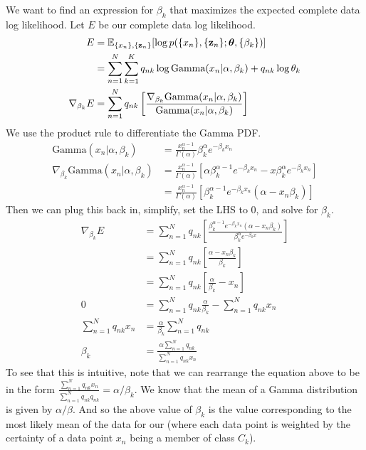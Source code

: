 \documentclass[submit]{harvardml}
\newcommand{\E}{\mathbb{E}}
\begin{document}
We want to find an expression for $\beta_k$ that maximizes the expected complete data log likelihood. Let $E$ be our complete data log likelihood.
\begin{align*}
    E &= \E_{\{x_n\}, \{\vb{z}_n\}}[\log p(\{x_n\}, \{ \vb{z}_n \} ; \btheta, \{ \beta_k \})]\\
    &= \sum_{n=1}^N \sum_{k=1}^K q_{n k} \log \text{Gamma}(x_n | \alpha, \beta_k) + q_{n k} \log \theta_k \\
    \nabla_{\beta_k}E &= \sum_{n=1}^N q_{n k} \left[\frac{\nabla_{\beta_k} \text{Gamma}(x_n | \alpha, \beta_k)}{\text{Gamma}(x_n | \alpha, \beta_k)}  \right]
\end{align*}
We use the product rule to differentiate the Gamma PDF.
\begin{align*}
    \text{Gamma}(x_n | \alpha, \beta_k) &= \frac{x_n^{\alpha - 1}}{\Gamma(\alpha)}\beta_k^{\alpha}e^{-\beta_k x_n}\\
    \nabla_{\beta_k}\text{Gamma}(x_n | \alpha, \beta_k) &= \frac{x_n^{\alpha - 1}}{\Gamma(\alpha)} \left[ \alpha \beta_k^{\alpha - 1} e^{-\beta_k x_n} - x \beta_k^{\alpha} e^{- \beta_k x_n} \right]\\
    &= \frac{x_n^{\alpha - 1}}{\Gamma(\alpha)} \left[ \beta_k^{\alpha - 1}e^{-\beta_k x_n}(\alpha - x_n \beta_k) \right]
\end{align*}
Then we can plug this back in, simplify, set the LHS to 0, and solve for $\beta_k$.
\begin{align*}
    \nabla_{\beta_k}E &= \sum_{n=1}^N q_{n k} \left[\frac{\beta_k^{\alpha - 1}e^{-\beta_k x_n}(\alpha - x_n \beta_k)}{\beta_k^{\alpha} e^{-\beta_k x}}\right]\\
    &= \sum_{n=1}^N q_{n k} \left[ \frac{\alpha - x_n \beta_k}{\beta_k}\right]\\
    &= \sum_{n=1}^N q_{n k} \left[ \frac{\alpha}{\beta_k} - x_n\right]\\
    0 &= \sum_{n=1}^N q_{n k} \frac{\alpha}{\beta_k} - \sum_{n=1}^N q_{n k} x_n \\
    \sum_{n=1}^N q_{n k} x_n &= \frac{\alpha}{\beta_k} \sum_{n=1}^N q_{n k} \\
    \beta_k &= \frac{\alpha \sum_{n=1}^N q_{n k}}{\sum_{n=1}^N q_{n k} x_n}
\end{align*}
To see that this is intuitive, note that we can rearrange the equation above to be in the form $\frac{\sum_{n=1}^N q_{n k} x_n}{\sum_{n=1}^N q_{n k} q_{n k}} = \alpha / \beta_k$. We know that the mean of a Gamma distribution is given by $\alpha / \beta$. And so the above value of $\beta_k$ is the value corresponding to the most likely mean of the data for our (where each data point is weighted by the certainty of a data point $x_n$ being a member of class $C_k$).
\end{document}
